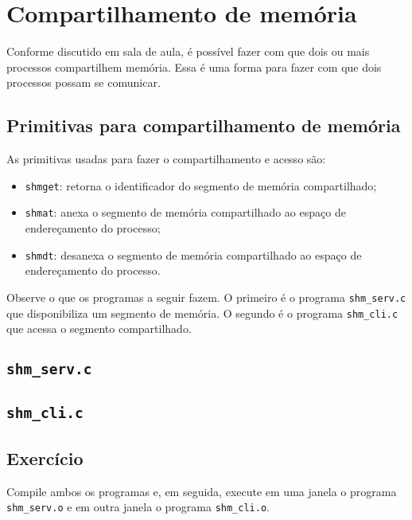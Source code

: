 \chapter{Compartilhamento de memória}

Conforme discutido em sala de aula, é possível fazer com que dois ou mais processos compartilhem memória. Essa é uma forma para fazer com que dois processos possam se comunicar.

\section{Primitivas para compartilhamento de memória}
As primitivas usadas para fazer o compartilhamento e acesso são:
\begin{itemize}
\setlength{\itemsep}{1pt}\setlength{\parskip}{0pt}  \setlength{\parsep}{0pt}
\item \texttt{shmget}: retorna o identificador do segmento de memória compartilhado;
\item \texttt{shmat}: anexa o segmento de memória compartilhado ao espaço de endereçamento do processo;
\item \texttt{shmdt}: desanexa o segmento de memória compartilhado ao espaço de endereçamento do processo.
\end{itemize}

Observe o que os programas a seguir fazem. O primeiro é o programa \texttt{shm\_serv.c} que disponibiliza um segmento de memória. O segundo é o programa \texttt{shm\_cli.c} que acessa o segmento compartilhado.

\section*{\texttt{shm\_serv.c}}


\newpage
\section*{\texttt{shm\_cli.c}}


\section{Exercício}

Compile ambos os programas e, em seguida, execute em uma janela o programa  \texttt{shm\_serv.o} e em outra janela o programa \texttt{shm\_cli.o}.

